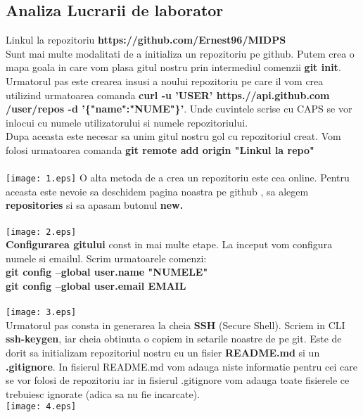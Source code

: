 \subsection{Analiza Lucrarii de laborator}
\tab Linkul la repozitoriu \textbf{https://github.com/Ernest96/MIDPS}\\
Sunt mai multe modalitati de a initializa un repozitoriu pe github.
Putem crea o mapa goala in care vom plasa gitul nostru prin intermediul comenzii \textbf{git init}.\\
\tab Urmatorul pas este crearea insusi a noului repozitoriu pe care il vom crea utilizind urmatoarea comanda
\textbf{curl -u 'USER' https.//api.github.com\\/user/repos -d '\{"name":"NUME"\}'}. Unde cuvintele scrise cu CAPS
se vor inlocui cu numele utilizatorului si numele repozitoriului.\\
\tab Dupa aceasta este necesar sa unim gitul nostru gol cu repozitoriul creat.
Vom folosi urmatoarea comanda \textbf{git remote add origin "Linkul la repo"}\\
\\
\texttt{[image: 1.eps]}
\clearpage
\tab O alta metoda de a crea un repozitoriu este cea online.
Pentru aceasta este nevoie sa deschidem pagina noastra pe github , sa alegem \textbf{repositories} si sa apasam butonul \textbf{new.}\\
\\
\texttt{[image: 2.eps]}
\\
\tab \textbf{Configurarea gitului} const in mai multe etape. La inceput vom configura numele si emailul.
Scrim urmatoarele comenzi:\\
\textbf{git config --global user.name "NUMELE"}\\
\textbf{git config --global user.email EMAIL}\\
\\
\texttt{[image: 3.eps]}
\\
\tab Urmatorul pas consta in generarea la cheia \textbf{SSH} (Secure Shell). Scriem in CLI \textbf{ssh-keygen},
iar cheia obtinuta o copiem in setarile noastre de pe git.
\tab Este de dorit sa initializam repozitoriul nostru cu un fisier \textbf{README.md} si un \textbf{.gitignore}. In fisierul
README.md vom adauga niste informatie pentru cei care se vor folosi de repozitoriu iar in fisierul .gitignore vom adauga
toate fisierele ce trebuiesc ignorate (adica sa nu fie incarcate).
\\
\texttt{[image: 4.eps]}
\\
\clearpage
